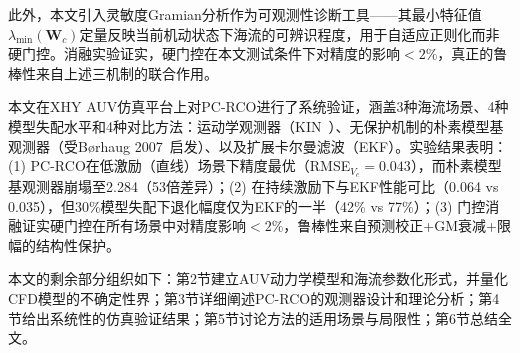 此外，本文引入灵敏度Gramian分析作为可观测性诊断工具——其最小特征值$\lambda_{\min}(\bm{W}_c)$定量反映当前机动状态下海流的可辨识程度，用于自适应正则化而非硬门控。消融实验证实，硬门控在本文测试条件下对精度的影响$<2\%$，真正的鲁棒性来自上述三机制的联合作用。

本文在XHY AUV仿真平台上对PC-RCO进行了系统验证，涵盖3种海流场景、4种模型失配水平和4种对比方法：运动学观测器（KIN~\cite{liang2018three}）、无保护机制的朴素模型基观测器（受B{\o}rhaug 2007~\cite{borhaug2007model}启发）、以及扩展卡尔曼滤波（EKF）。实验结果表明：(1) PC-RCO在低激励（直线）场景下精度最优（RMSE$_{V_c}=0.043$），而朴素模型基观测器崩塌至2.284（53倍差异）；(2) 在持续激励下与EKF性能可比（0.064 vs 0.035），但30\%模型失配下退化幅度仅为EKF的一半（42\% vs 77\%）；(3) 门控消融证实硬门控在所有场景中对精度影响$<2\%$，鲁棒性来自预测校正+GM衰减+限幅的结构性保护。

本文的剩余部分组织如下：第2节建立AUV动力学模型和海流参数化形式，并量化CFD模型的不确定性界；第3节详细阐述PC-RCO的观测器设计和理论分析；第4节给出系统性的仿真验证结果；第5节讨论方法的适用场景与局限性；第6节总结全文。
